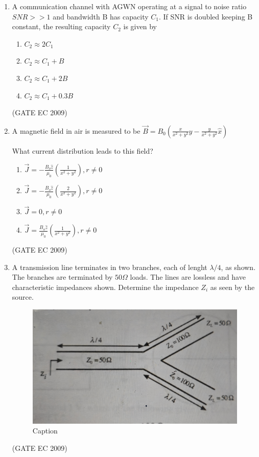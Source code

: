 \documentclass[journal,12pt,onecolumn]{IEEEtran}
\theoremstyle{remark}
\begin{document}
\begin{enumerate}[start=1, label={Q\arabic*.}]
\item A communication channel with AGWN operating at a signal to noise ratio $SNR>>1$ and bandwidth B has capacity $C_1$. If SNR is doubled keeping B constant, the resulting capacity $C_2$ is given by 
\begin{enumerate}[label=(\Alph*)]
        \item $C_2 \approx 2 C_1$
        \item $C_2 \approx  C_1+B$
        \item $C_2 \approx  C_1 + 2B$
        \item $C_2 \approx  C_1+ 0.3B$
\end{enumerate}
\hfill (GATE EC 2009)

\item A magnetic field in air is measured to be $\vec{B} = B_0(\frac{x}{x^2+y^2} \hat{y} - \frac{y}{x^2+y^2} \hat{x})$

What current distribution leads to this field? 
\begin{enumerate}[label=(\Alph*)]
        \item $\vec{J}= -\frac{B_o \hat{z}}{\mu_0} ( \frac{1}{x^2 + y^2}), r \neq 0$
        \item $\vec{J}= -\frac{B_o \hat{z}}{\mu_0} ( \frac{2}{x^2 + y^2}), r \neq 0$
        \item $\vec{J}= 0, r\neq 0$
        \item $\vec{J}= \frac{B_o \hat{z}}{\mu_0} ( \frac{1}{x^2 + y^2}), r \neq 0$
\end{enumerate}
\hfill (GATE EC 2009)

\item A transmission line terminates in two branches, each of lenght $\lambda/4$, as shown. The branches are terminated by $50 \Omega$ loads. The lines are lossless and have characteristic impedances shown. Determine the impedance $Z_i$ as seen by the source.
\begin{figure}[H]
    \centering
    \includegraphics[width=0.5\linewidth]{images/img_21.jpg}
    \caption{Caption}
    \label{fig:placeholder}
\end{figure}
\begin{enumerate}[label=(\Alph*)]
\end{enumerate}
\hfill (GATE EC 2009)


\end{enumerate}
\end{document}

